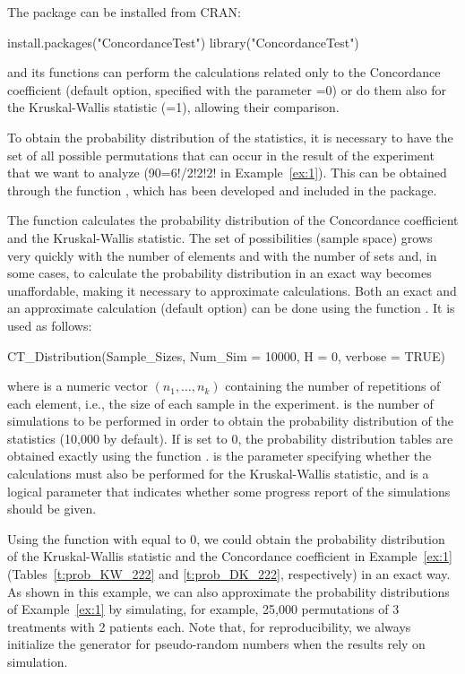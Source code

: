 The   package can be installed from CRAN:

\begin{example}
install.packages("ConcordanceTest")
library("ConcordanceTest")
\end{example}

and its functions can perform the calculations related only to the Concordance coefficient (default option, specified with the parameter =0) or do them also for the Kruskal-Wallis statistic (=1), allowing their comparison. 

To obtain the probability distribution of the statistics, it is necessary to have the set of all possible permutations that can occur in the result of the experiment that we want to analyze (90=6!/2!2!2! in Example~\ref{ex:1}). This can be obtained through the function , which has been developed and included in the  package. 


The function  calculates the probability distribution of the Concordance coefficient and the Kruskal-Wallis statistic. The set of possibilities (sample space) grows very quickly with the number of elements and with the number of sets and, in some cases, to calculate the probability distribution in an exact way becomes unaffordable, making it necessary to approximate calculations. Both an exact and an approximate calculation (default option) can be done using the function . It is used as follows:
\begin{example}
CT_Distribution(Sample_Sizes, Num_Sim = 10000, H = 0, verbose = TRUE)
\end{example}
where  is a numeric vector $(n_1,\ldots,n_k)$ containing the number of repetitions of each element, i.e., the size of each sample in the experiment.  is the number of simulations to be performed in order to obtain the probability distribution of the statistics (10,000 by default). If  is set to 0, the probability distribution tables are obtained exactly using the function .  is the parameter specifying whether the calculations must also be performed for the Kruskal-Wallis statistic, and  is a logical parameter that indicates whether some progress report of the simulations should be given.


\setcounter{exmp}{0}
\begin{exmp}[Cont.] 
Using the function  with  equal to 0, we could obtain the probability distribution of the Kruskal-Wallis statistic and the Concordance coefficient in Example~\ref{ex:1} (Tables~\ref{t:prob_KW_222} and \ref{t:prob_DK_222}, respectively) in an exact way. As shown in this example, we can also approximate the probability distributions of Example~\ref{ex:1} by simulating, for example, 25,000 permutations of 3 treatments with 2 patients each. Note that, for reproducibility, we always initialize the generator for pseudo-random numbers when the results rely on simulation.
\end{exmp} 
 
